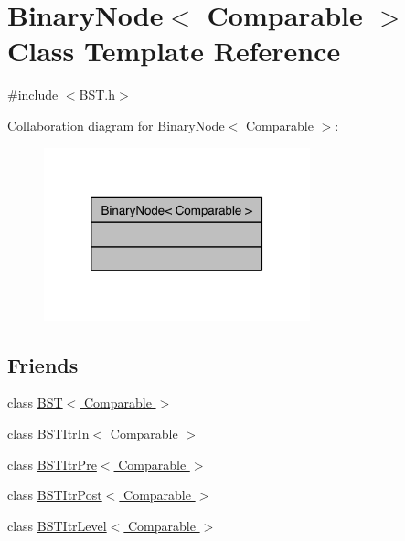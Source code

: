\hypertarget{class_binary_node}{\section{Binary\-Node$<$ Comparable $>$ Class Template Reference}
\label{class_binary_node}
}


{\ttfamily \#include $<$B\-S\-T.\-h$>$}



Collaboration diagram for Binary\-Node$<$ Comparable $>$\-:
\nopagebreak
\begin{figure}[H]
\begin{center}
\leavevmode
\includegraphics[width=218pt]{class_binary_node__coll__graph}
\end{center}
\end{figure}
\subsection*{Friends}
\begin{DoxyCompactItemize}
\item 
class \hyperlink{class_binary_node_a28a1adb9906f3ff7e12c2cb6fa2bd54e}{B\-S\-T$<$ Comparable $>$}
\item 
class \hyperlink{class_binary_node_aab3993acac2ab24a0b59edb0c3acc775}{B\-S\-T\-Itr\-In$<$ Comparable $>$}
\item 
class \hyperlink{class_binary_node_a45a55df6f11541416d4ea7684c575c1a}{B\-S\-T\-Itr\-Pre$<$ Comparable $>$}
\item 
class \hyperlink{class_binary_node_a5dc153694be266f6e772659486219da7}{B\-S\-T\-Itr\-Post$<$ Comparable $>$}
\item 
class \hyperlink{class_binary_node_a26ff00bc0d87069aed877f10fd3c80a8}{B\-S\-T\-Itr\-Level$<$ Comparable $>$}
\end{DoxyCompactItemize}


